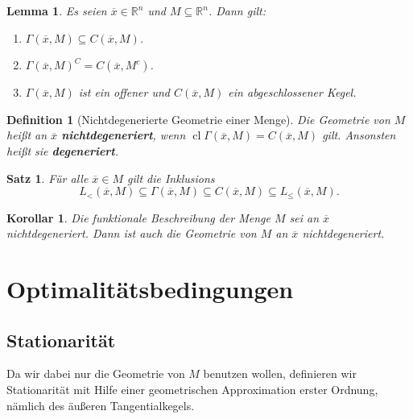 \documentclass[11pt]{scrreprt}
\newcounter{thm}
\theoremstyle{thmstyle}
\numberwithin{thm}{section}
\newtheorem{definition}[thm]{Definition}
\newtheorem{korollar}[thm]{Korollar}
\newtheorem{lemma}[thm]{Lemma}
\newtheorem{satz}[thm]{Satz}
\begin{document}
\begin{lemma}
	Es seien $\overline{x} \in \mathbb{R}^n$ und $M \subseteq \mathbb{R}^n$. Dann gilt:
	\begin{enumerate}[label=\alph*\upshape)]
		\item $\Gamma(\overline{x}, M) \subseteq C(\overline{x}, M)$.
		\item $\Gamma(\overline{x}, M)^C = C(\overline{x}, M^c)$.
		\item $\Gamma(\overline{x}, M)$ ist ein offener und $C(\overline{x}, M)$ ein abgeschlossener Kegel.
	\end{enumerate}
\end{lemma}

\begin{definition}[Nichtdegenerierte Geometrie einer Menge]
	Die Geometrie von $M$ heißt an $\overline{x}$ \textbf{nichtdegeneriert}, wenn $\operatorname{cl} \Gamma(\overline{x}, M) = C(\overline{x}, M)$ gilt. Ansonsten heißt sie \textbf{degeneriert}.
\end{definition}

\setcounter{thm}{23}

\begin{satz}
	Für alle $\overline{x} \in M$ gilt die Inklusions
	$$ L_{<}(\overline{x}, M) \subseteq \Gamma(\overline{x}, M) \subseteq C(\overline{x}, M) \subseteq L_{\leq}(\overline{x}, M). $$
\end{satz}

\setcounter{thm}{25}

\begin{korollar}
	Die funktionale Beschreibung der Menge $M$ sei an $\overline{x}$ nichtdegeneriert. Dann ist auch die Geometrie von $M$ an $\overline{x}$ nichtdegeneriert.
\end{korollar}

\section*{Optimalitätsbedingungen}

\subsection*{Stationarität}

\setcounter{section}{2}
\setcounter{thm}{0}

Da wir dabei nur die Geometrie von $M$ benutzen wollen, definieren wir Stationarität mit Hilfe einer geometrischen Approximation erster Ordnung, nämlich des äußeren Tangentialkegels.
\end{document}

